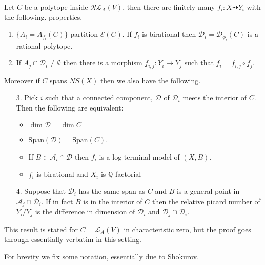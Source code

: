 	\begin{theorem}\label{assumptions}\cite[Theorem 3.3]{hacon2009sarkisov}
		Let $C$ be a polytope inside $\mathcal{RL}_{A}(V)$, then there are finitely many $f_{i}:X \dashrightarrow Y_{i}$ with the following. properties.
		
		\begin{enumerate}
			\item $\{A_{i}=A_{f_{i}}(C)\}$ partition $\mathcal{E}(C)$. If $f_{i}$ is birational then $\mathcal{D}_{i}=\mathcal{D}_{\phi_{i}}(C)$ is a rational polytope.
			\item If $A_{j} \cap \mathcal{D}_{i} \neq \emptyset$ then there is a morphism $f_{i,j}:Y_{i} \to Y_{j}$ such that $f_{i}=f_{i,j} \circ f_{j}$.
		\end{enumerate}
		
		Moreover if $C$ spans $NS(X)$ then we also have the following.
		
		\begin{enumerate}
			\item[3.] Pick $i$ such that a connected component, $\mathcal{D}$ of $\mathcal{D}_{i}$ meets the interior of $C$. Then the following are equivalent:
			\begin{itemize}
				\item $\dim \mathcal{D}= \dim C$
				\item $\text{Span}(\mathcal{D})=\text{Span}(C)$.
				\item If $B \in \mathcal{A}_{i} \cap \mathcal{D}$ then $f_{i}$ is a log terminal model of $(X,B)$.
				\item $f_{i}$ is birational and $X_{i}$ is $\mathbb{Q}$-factorial
			\end{itemize} 
			
			\item[4.] Suppose that $\mathcal{D}_{i}$ has the same span as $C$ and $B$ is a general point in $\mathcal{A}_{j} \cap \mathcal{D}_{i}$. If in fact $B$ is in the interior of $C$ then the relative picard number of $Y_{i}/Y_{j}$ is the difference in dimension of $\mathcal{D}_{i}$ and $\mathcal{D}_{j} \cap \mathcal{D}_{i}$. 
			
		\end{enumerate}
	\end{theorem}
	
	This result is stated for $C=\mathcal{L}_{A}(V)$ in characteristic zero, but the proof goes through essentially verbatim in this setting.
	
	For brevity we fix some notation, essentially due to Shokurov.
	
